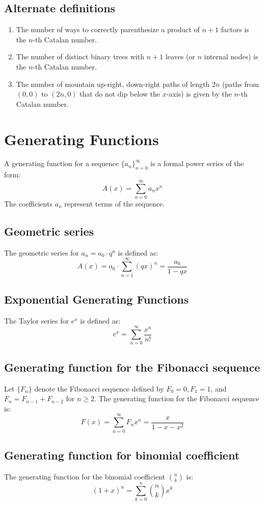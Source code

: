 \documentclass{article}
\begin{document}
\subsection{Alternate definitions}

\begin{enumerate}
    \item The number of ways to correctly parenthesize a product of $n+1$ factors is the $n$-th Catalan number.
    \item The number of distinct binary trees with $n+1$ leaves (or $n$ internal nodes) is the $n$-th Catalan number.
    \item The number of mountain up-right, down-right paths of length $2n$ (paths from $(0,0)$ to $(2n,0)$ that do not dip below the $x$-axis) is given by the $n$-th Catalan number.
\end{enumerate}

\section{Generating Functions}

A generating function for a sequence \( \{a_n\}_{n=0}^{\infty} \) is a formal power series of the form:
\[ A(x) = \sum_{n=0}^{\infty} a_n x^n \]
The coefficients \( a_n \) represent terms of the sequence.

\subsection{Geometric series}

The geometric series for $a_n=a_0\cdot q^n$ is defined as:
\[ A(x) = a_0 \cdot \sum_{n=1}^{\infty} (qx)^{n} = \frac{a_0}{1-qx}\]

\subsection{Exponential Generating Functions}

The Taylor series for $e^x$ is defined as:
\[ e^{x} = \sum_{n=0}^{\infty} \frac{x^n}{n!} \]

\subsection{Generating function for the Fibonacci sequence}

Let \( \{F_n\} \) denote the Fibonacci sequence defined by \( F_0 = 0, F_1 = 1 \), and \( F_{n} = F_{n-1} + F_{n-2} \) for \( n \geq 2 \). The generating function for the Fibonacci sequence is:
\[ F(x) = \sum_{n=0}^{\infty} F_n x^n = \frac{x}{1 - x - x^2} \]

\subsection{Generating function for binomial coefficient}

The generating function for the binomial coefficient \( \binom{n}{k} \) is:
\[ (1+x)^n = \sum_{k=0}^{n} \binom{n}{k} x^k \]
\end{document}
